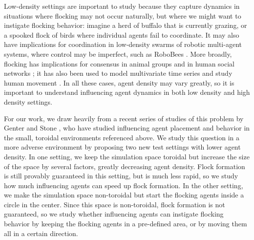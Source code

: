 Low-density settings are important to study because they capture dynamics in
situations where flocking may not occur naturally, but where we might want to
instigate flocking behavior: imagine a herd of buffalo that is currently
grazing, or a spooked flock of birds where individual agents fail to
coordinate.
It may also have implications for coordination in low-density swarms of
robotic multi-agent systems, where control may be imperfect, such as RoboBees
\cite{Chen2017Robobees}.
More broadly, flocking has implications for consensus in animal groups
\cite{Yang2006Consensus, sumpter2008fish, couzin2005} and in human social
networks \cite{liang2012opinion};
it has also been used to model multivariate time series and study human
movement \cite{schruben2010multivariate, singham2011agentmovement}.
In all these cases, agent density may vary greatly, so it is important to
understand influencing agent dynamics in both low density and high density
settings.


For our work, we draw heavily from a recent series of studies of this problem by
Genter and Stone \cite{genter2013backsearch, genter2013visionstationary, 
genter2014neighborsorientherd, genter2015placement, genter2016facegoalfacecurrent, 
genter201612steplookahead, genterthesis}, who have studied influencing agent
placement and behavior in the small, toroidal environments referenced above.
We study this question in a more adverse environment by proposing two new test 
settings with lower agent density.
In one setting, we keep the simulation space toroidal but increase the size of
the space by several factors, greatly decreasing agent density.
Flock formation is still provably guaranteed in this setting, but is much less
rapid, so we study how much influencing agents can speed up flock formation.
In the other setting, we make the simulation space non-toroidal but start the
flocking agents inside a circle in the center.
Since this space is non-toroidal, flock formation is not guaranteed, so we
study whether influencing agents can instigate flocking behavior by keeping the
flocking agents in a pre-defined area, or by moving them all in a certain
direction.

